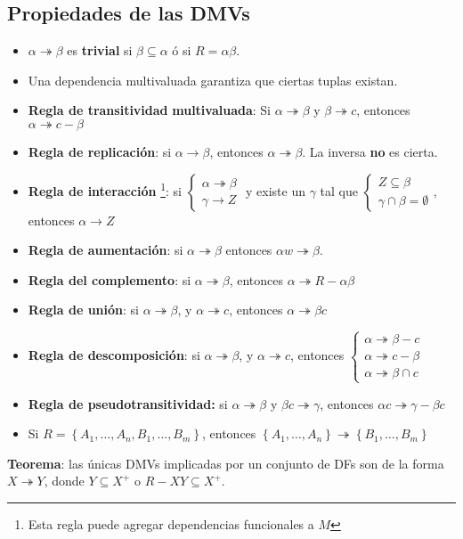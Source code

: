 \documentclass[a4paper, twoside]{article}
\begin{document}
\subsection{Propiedades de las DMVs}
\begin{itemize}
\item $\alpha\twoheadrightarrow\beta$ es \textbf{trivial} si $\beta\subseteq\alpha$
ó si $R=\alpha\beta$.
\item Una dependencia multivaluada garantiza que ciertas tuplas existan.
\item \textbf{Regla de transitividad} \textbf{multivaluada}: Si $\alpha\twoheadrightarrow\beta$
y $\beta\twoheadrightarrow c$, entonces $\alpha\twoheadrightarrow c-\beta$
\item \textbf{Regla de replicación}: si $\alpha\to\beta$, entonces $\alpha\twoheadrightarrow\beta$.
La inversa \textbf{no} es cierta.
\item \textbf{Regla de interacción}%
\footnote{Esta regla puede agregar dependencias funcionales a $M$%
}: si $\begin{cases}
\alpha\twoheadrightarrow\beta\\
\gamma\to Z
\end{cases}$ y existe un $\gamma$ tal que $\begin{cases}
Z\subseteq\beta\\
\gamma\cap\beta=\emptyset
\end{cases}$, entonces $\alpha\to Z$
\item \textbf{Regla de aumentación}: si $\alpha\twoheadrightarrow\beta$
entonces $\alpha w\twoheadrightarrow\beta$.
\item \textbf{Regla del complemento}: si $\alpha\twoheadrightarrow\beta$,
entonces $\alpha\twoheadrightarrow R-\alpha\beta$
\item \textbf{Regla de unión}: si $\alpha\twoheadrightarrow\beta$, y $\alpha\twoheadrightarrow c$,
entonces $\alpha\twoheadrightarrow\beta c$
\item \textbf{Regla de descomposición}: si $\alpha\twoheadrightarrow\beta$,
y $\alpha\twoheadrightarrow c$, entonces $\begin{cases}
\alpha\twoheadrightarrow\beta-c\\
\alpha\twoheadrightarrow c-\beta\\
\alpha\twoheadrightarrow\beta\cap c
\end{cases}$
\item \textbf{Regla de pseudotransitividad:} si $\alpha\twoheadrightarrow\beta$
y $\beta c\twoheadrightarrow\gamma$, entonces $\alpha c\twoheadrightarrow\gamma-\beta c$
\item Si $R=\left\{ A_{1},\ldots,A_{n},B_{1},\ldots,B_{m}\right\} $, entonces
$\left\{ A_{1},\ldots,A_{n}\right\} \twoheadrightarrow\left\{ B_{1},\ldots,B_{m}\right\} $
\end{itemize}
\textbf{Teorema}: las únicas DMVs implicadas por un conjunto de DFs
son de la forma $X\twoheadrightarrow Y$, donde $Y\subseteq X^{+}$
o $R-XY\subseteq X^{+}$.
\end{document}
